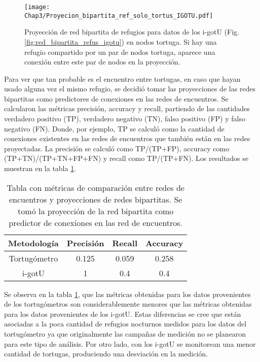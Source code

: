 \begin{figure}[ht]
    \begin{center}
        \texttt{[image: Chap3/Proyecion\_bipartita\_ref\_solo\_tortus\_IGOTU.pdf]}
        \caption[Proyección  de red bipartita de refugios para datos de los tortugómetros en nodos tortuga.]{Proyección  de red bipartita de refugios para datos de los i-gotU (Fig. \ref{fig:red_bipartita_refus_igotu}) en nodos tortuga. Si hay una refugio compartido por un par de nodos tortuga, aparece una conexión entre este par de nodos en la proyección. }
        \label{fig:proyeccion_red_igotu}
       
        \end{center}
\end{figure}
Para  ver que tan probable es el encuentro entre tortugas, en caso que hayan usado alguna vez el mismo refugio, se decidió tomar las proyecciones de las redes bipartitas como predictores de conexiones en las redes de encuentros. Se calcularon las métricas precisión, accuracy y recall, partiendo de las cantidades verdadero positivo (TP), verdadero negativo (TN), falso positivo (FP) y falso negativo (FN). Donde, por ejemplo, TP se calculó como la cantidad de conexiones existentes en las redes de encuentros que también están en las redes proyectadas. La precisión se calculó como TP/(TP+FP), accuracy como (TP+TN)/(TP+TN+FP+FN) y  recall como TP/(TP+FN). Los resultados se muestran en la tabla \ref{tab:metricas_comparacion_redes}.

\begin{table}[ht]
    \centering
    \begin{tabular}{|c|c|c|c|}
       
   \hline
    Metodología  & Precisión & Recall & Accuracy \\ \hline
    Tortugómetro & 0.125     & 0.059  & 0.258    \\ \hline
    i-gotU       & 1         & 0.4    & 0.4       \\ \hline
   
    \end{tabular}
    \caption[Tabla con métricas de comparación entre redes de encuentros y proyecciones de redes bipartitas.]{Tabla con métricas de comparación entre redes de encuentros y proyecciones de redes bipartitas. Se tomó la proyección de la red bipartita como predictor de conexiones en las red de encuentros.}
    \label{tab:metricas_comparacion_redes}
\end{table}

Se observa en la tabla \ref{tab:metricas_comparacion_redes}, que las métricas obtenidas para los datos provenientes de los tortugómetros son considerablemente menores que las métricas obtenidas para los datos provenientes de los i-gotU. Estas diferencias se cree que están asociadas a la poca cantidad de refugios nocturnos medidos para los datos del tortugómetro ya que originalmente las campañas de medición no se planearon para este tipo de análisis. Por otro lado, con los i-gotU se monitorean una menor cantidad de tortugas, produciendo una desviación en la medición.
 
